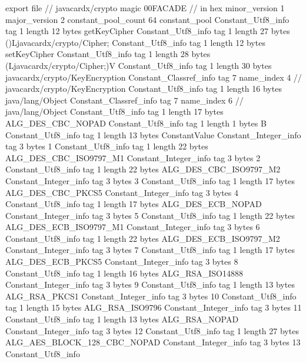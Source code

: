 export file {		// javacardx/crypto
	magic	00FACADE		 // in hex
	minor_version	1
	major_version	2
	constant_pool_count	64
	constant_pool {
		Constant_Utf8_info {
			tag	1
			length	12
			bytes	getKeyCipher
		}
		Constant_Utf8_info {
			tag	1
			length	27
			bytes	()Ljavacardx/crypto/Cipher;
		}
		Constant_Utf8_info {
			tag	1
			length	12
			bytes	setKeyCipher
		}
		Constant_Utf8_info {
			tag	1
			length	28
			bytes	(Ljavacardx/crypto/Cipher;)V
		}
		Constant_Utf8_info {
			tag	1
			length	30
			bytes	javacardx/crypto/KeyEncryption
		}
		Constant_Classref_info {
			tag	7
			name_index	4		// javacardx/crypto/KeyEncryption
		}
		Constant_Utf8_info {
			tag	1
			length	16
			bytes	java/lang/Object
		}
		Constant_Classref_info {
			tag	7
			name_index	6		// java/lang/Object
		}
		Constant_Utf8_info {
			tag	1
			length	17
			bytes	ALG_DES_CBC_NOPAD
		}
		Constant_Utf8_info {
			tag	1
			length	1
			bytes	B
		}
		Constant_Utf8_info {
			tag	1
			length	13
			bytes	ConstantValue
		}
		Constant_Integer_info {
			tag	3
			bytes	1
		}
		Constant_Utf8_info {
			tag	1
			length	22
			bytes	ALG_DES_CBC_ISO9797_M1
		}
		Constant_Integer_info {
			tag	3
			bytes	2
		}
		Constant_Utf8_info {
			tag	1
			length	22
			bytes	ALG_DES_CBC_ISO9797_M2
		}
		Constant_Integer_info {
			tag	3
			bytes	3
		}
		Constant_Utf8_info {
			tag	1
			length	17
			bytes	ALG_DES_CBC_PKCS5
		}
		Constant_Integer_info {
			tag	3
			bytes	4
		}
		Constant_Utf8_info {
			tag	1
			length	17
			bytes	ALG_DES_ECB_NOPAD
		}
		Constant_Integer_info {
			tag	3
			bytes	5
		}
		Constant_Utf8_info {
			tag	1
			length	22
			bytes	ALG_DES_ECB_ISO9797_M1
		}
		Constant_Integer_info {
			tag	3
			bytes	6
		}
		Constant_Utf8_info {
			tag	1
			length	22
			bytes	ALG_DES_ECB_ISO9797_M2
		}
		Constant_Integer_info {
			tag	3
			bytes	7
		}
		Constant_Utf8_info {
			tag	1
			length	17
			bytes	ALG_DES_ECB_PKCS5
		}
		Constant_Integer_info {
			tag	3
			bytes	8
		}
		Constant_Utf8_info {
			tag	1
			length	16
			bytes	ALG_RSA_ISO14888
		}
		Constant_Integer_info {
			tag	3
			bytes	9
		}
		Constant_Utf8_info {
			tag	1
			length	13
			bytes	ALG_RSA_PKCS1
		}
		Constant_Integer_info {
			tag	3
			bytes	10
		}
		Constant_Utf8_info {
			tag	1
			length	15
			bytes	ALG_RSA_ISO9796
		}
		Constant_Integer_info {
			tag	3
			bytes	11
		}
		Constant_Utf8_info {
			tag	1
			length	13
			bytes	ALG_RSA_NOPAD
		}
		Constant_Integer_info {
			tag	3
			bytes	12
		}
		Constant_Utf8_info {
			tag	1
			length	27
			bytes	ALG_AES_BLOCK_128_CBC_NOPAD
		}
		Constant_Integer_info {
			tag	3
			bytes	13
		}
		Constant_Utf8_info {
}}}
